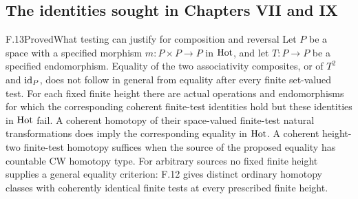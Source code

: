 \subsection{The identities sought in Chapters VII and IX}

\begin{claim}{F.13}{Proved}{What testing can justify for composition and reversal}
Let $P$ be a space with a specified morphism
$m:P\times P\to P$ in $\mathrm{Hot}$, and let $T:P\to P$ be a
specified endomorphism. Equality of the two associativity
composites, or of $T^2$ and $\mathrm{id}_P$, does not follow in general
from equality after every finite set-valued test. For each fixed
finite height there are actual operations and endomorphisms for
which the corresponding coherent finite-test identities hold
but these identities in $\mathrm{Hot}$ fail. A coherent
homotopy of their space-valued finite-test natural
transformations does imply the corresponding equality in
$\mathrm{Hot}$. A coherent height-two finite-test homotopy suffices
when the source of the proposed equality has countable CW
homotopy type. For arbitrary sources no fixed finite height
supplies a general equality criterion: F.12 gives distinct
ordinary homotopy classes with coherently identical finite tests
at every prescribed finite height.
\end{claim}
